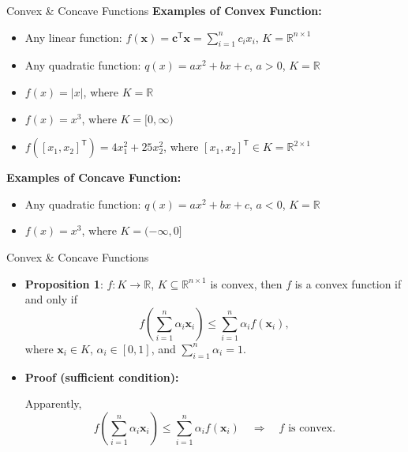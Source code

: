\documentclass[aspectratio=169,hyperref,UTF8,CJK]{beamer}
\newcommand{\R}{\mathbb{R}}
\newcommand{\trans}{\mathsf{T}}
\newcommand{\vect}[1]{\boldsymbol{#1}}
\begin{document}
\begin{frame}{Convex \& Concave Functions}
  \small
  \textbf{Examples of Convex Function:}
  \begin{itemize}
    \item Any linear function: $f(\vect{x})=\vect{c}^{\trans}\vect{x}=\sum_{i=1}^{n}c_ix_i$, $K=\R^{n\times1}$
    \item Any quadratic function: $q(x)=ax^2+bx+c$, $a>0$, $K=\R$
    \item $f(x)=|x|$, where $K=\R$
    \item $f(x)=x^3$, where $K=[0,\infty)$
    \item $f([x_1,x_2]^{\trans})=4x_1^2+25x_2^2$, where $[x_1,x_2]^{\trans}\in K=\R^{2\times1}$
  \end{itemize}
  \textbf{Examples of Concave Function:}
  \begin{itemize}
    \item Any quadratic function: $q(x)=ax^2+bx+c$, $a<0$, $K=\R$
    \item $f(x)=x^3$, where $K=(-\infty,0]$
  \end{itemize}
\end{frame}

\begin{frame}{Convex \& Concave Functions}
  \small
  \begin{itemize}
    \item \textbf{Proposition 1}: $f:K\to\R$, $K\subseteq\R^{n\times1}$ is convex, then $f$ is a convex function if and only if
      \begin{equation*}
        f\left(\sum_{i=1}^{n}\alpha_i\vect{x}_i\right)
        \le\sum_{i=1}^{n}\alpha_i f(\vect{x}_i),
      \end{equation*}
      where $\vect{x}_i\in K$, $\alpha_i\in[0,1]$, and $\sum_{i=1}^{n}\alpha_i=1$.
    \item \textbf{Proof (sufficient condition):}

      Apparently,
      \begin{equation*}
        f\left(\sum_{i=1}^{n}\alpha_i\vect{x}_i\right)
        \le\sum_{i=1}^{n}\alpha_i f(\vect{x}_i)
        \quad\Longrightarrow\quad f\text{ is convex}.
      \end{equation*}
  \end{itemize}
\end{frame}
\end{document}
